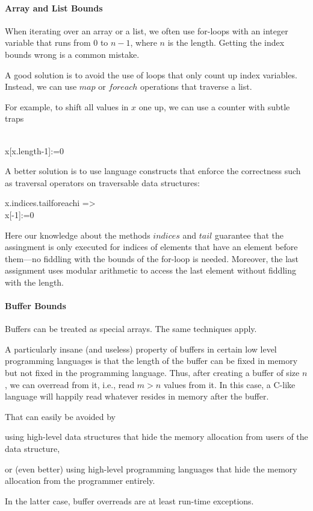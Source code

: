\paragraph{Array and List Bounds}
When iterating over an array or a list, we often use for-loops with an integer variable that runs from $0$ to $n-1$, where $n$ is the length.
Getting the index bounds wrong is a common mistake.

A good solution is to avoid the use of loops that only count up index variables.
Instead, we can use $map$ or $foreach$ operations that traverse a list.

For example, to shift all values in $x$ one up, we can use a counter with subtle traps 
\begin{acode}
\\
x[x.length-1]:=0
\end{acode}

A better solution is to use language constructs that enforce the correctness such as traversal operators on traversable data structures:
\begin{acode}
x.indices.tail\;foreach\;i =>\\
x[-1]:=0
\end{acode}
Here our knowledge about the methods $indices$ and $tail$ guarantee that the assingment is only executed for indices of elements that have an element before them---no fiddling with the bounds of the for-loop is needed.
Moreover, the last assignment uses modular arithmetic to access the last element without fiddling with the length.

\paragraph{Buffer Bounds}
Buffers can be treated as special arrays.
The same techniques apply.

A particularly insane (and useless) property of buffers in certain low level programming languages is that the length of the buffer can be fixed in memory but not fixed in the programming language.
Thus, after creating a buffer of size $n$, we can overread from it, i.e., read $m>n$ values from it.
In this case, a C-like language will happily read whatever resides in memory after the buffer.

That can easily be avoided by
\begin{compactitem}
 \item using high-level data structures that hide the memory allocation from users of the data structure,
 \item or (even better) using high-level programming languages that hide the memory allocation from the programmer entirely.
\end{compactitem}
In the latter case, buffer overreads are at least run-time exceptions.

